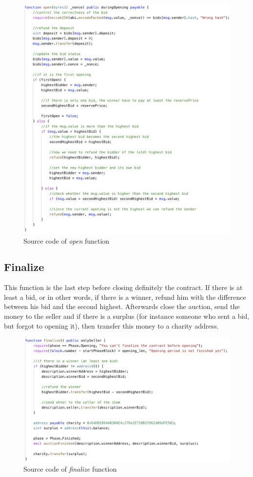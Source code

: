 \documentclass[runningheads,a4paper]{llncs}
\begin{document}
\begin{figure}[h]
\includegraphics[width=0.92\linewidth]{images/opening.png}
\centering
\caption{Source code of \emph{open} function}
\label{fig:vickreyOpen}
\end{figure}


\newpage
\subsection{Finalize}
This function is the last step before closing definitely the contract. If there is at least a bid, or in other words, if there is a winner, refund him with the difference between his bid and the second highest. Afterwards close the auction, send the money to the seller and if there is a surplus (for instance someone who sent a bid, but forgot to opening it), then transfer this money to a charity address.

\begin{figure}[h]
\includegraphics[width=0.9\linewidth]{images/finalize.png}
\centering
\caption{Source code of \emph{finalize} function}
\label{fig:vickreyFinalize}
\end{figure}
\end{document}
